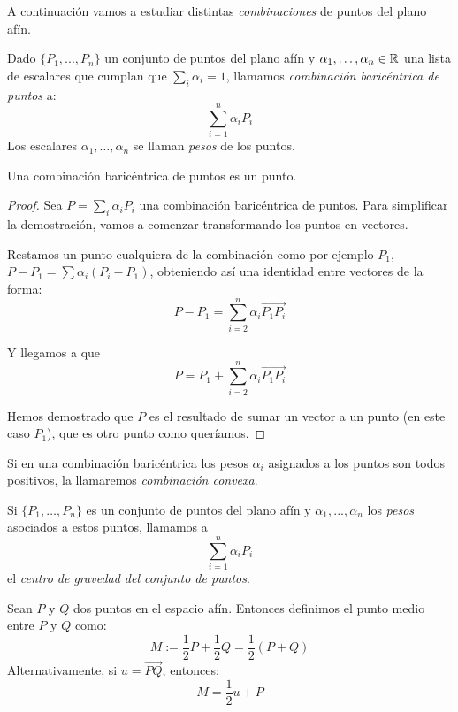 A continuación vamos a estudiar distintas \textit{combinaciones} de puntos del plano afín.

\begin{ndef}
  Dado $\{P_1,...,P_n\}$ un conjunto de puntos del plano afín y $\alpha_1,\dots,\alpha_n \in \mathbb{R}$ una lista de escalares que cumplan que $\sum_i \alpha_i = 1$, llamamos \textit{combinación baricéntrica de puntos} a:
  \[
    \sum_{i=1}^n \alpha_i P_i
  \]
  Los escalares $\alpha_1,\dots,\alpha_n$ se llaman \textit{pesos} de los puntos.
\end{ndef}

\begin{nprop} Una combinación baricéntrica de puntos es un punto.
\end{nprop}

\begin{proof}

  Sea $P = \sum_i \alpha_i P_i$ una combinación baricéntrica de puntos. Para simplificar la demostración, vamos a comenzar transformando los puntos en vectores.

  Restamos un punto cualquiera de la combinación como por ejemplo $P_1$, $P-P_1 = \sum \alpha_i(P_i-P_1)$, obteniendo así una identidad entre vectores de la forma:
  \[
    P-P_1 = \sum_{i=2}^n \alpha_i \overrightarrow{P_1P_i}
  \]

  Y llegamos a que
  \[
    P = P_1 + \sum_{i=2}^n \alpha_i \overrightarrow{P_1P_i}
  \]

  Hemos demostrado que $P$ es el resultado de sumar un vector a un punto (en este caso $P_1$), que es otro punto como queríamos.
\end{proof}

\begin{ndef}
  Si en una combinación baricéntrica los pesos $\alpha_i$ asignados a los puntos son todos positivos, la llamaremos \textit{combinación convexa}. \end{ndef}

\begin{ndef}
  Si $\{P_1,\dots,P_n\}$ es un conjunto de puntos del plano afín y $\alpha_1,...,\alpha_n$ los \textit{pesos} asociados a estos puntos, llamamos a
  \[
    \sum_{i=1}^n \alpha_iP_i
  \]
  el \textit{centro de gravedad del conjunto de puntos}.
\end{ndef}

\begin{ndef}
  Sean $P$ y $Q$ dos puntos en el espacio afín. Entonces definimos el punto medio entre $P$ y $Q$ como:
  \[
    M := \dfrac{1}{2} P + \dfrac{1}{2}Q = \dfrac{1}{2}(P+Q)
  \]
  Alternativamente, si $u = \overrightarrow{PQ}$, entonces:
  \[
    M = \dfrac{1}{2}u + P
  \]

\end{ndef}

